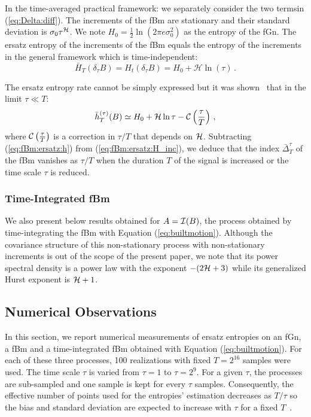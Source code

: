 \documentclass[aps,pra,groupedaddress,notitlepage]{revtex4-1}
\begin{document}
In the time-averaged practical framework: we separately consider the two terms\linebreak in (\ref{eq:Delta:diff}). The increments of the fBm are stationary and their standard deviation is $\sigma_0\tau^{\cal H}$. We note $H_0 = \frac{1}{2}\ln \left( 2\pi e \sigma_0^2\right)$ as the entropy of the fGn. The ersatz entropy of the increments of the fBm equals the entropy of the increments in the general framework which is time-independent:
\begin{equation}
\bar{H}_{T}(\delta_\tau B) = H_{t}(\delta_\tau B) = H_0 + \mathcal{H}\ln(\tau) \,. \label{eq:fBm:ersatz:H_inc}
\end{equation}

The ersatz entropy rate cannot be simply expressed but it was shown~\cite{GraneroBelinchon2019} that in the limit $\tau \ll T$:
\begin{equation}
\bar{h}_{T}^{(\tau)}(B) \simeq H_0 + \mathcal{H} \ln \tau - {\cal C}\left( \frac{\tau}{T}\right) \,, \label{eq:fBm:ersatz:h}
\end{equation}
%
where ${\cal C}\left( \frac{\tau}{T}\right)$ is a correction in $\tau/T$ that depends on ${\cal H}$. Subtracting (\ref{eq:fBm:ersatz:h}) from (\ref{eq:fBm:ersatz:H_inc}), we deduce that the index $\bar{\Delta}_T^{\tau}$ of the fBm vanishes as $\tau/T$ when the duration $T$ of the signal is increased or the time scale $\tau$ is reduced.


\subsubsection{Time-Integrated fBm} We also present below results obtained for $A={\cal I}(B)$, the process obtained by time-integrating the fBm with Equation (\ref{eq:builtmotion}).
Although the covariance structure of this non-stationary process with non-stationary increments is out of the scope of the present paper, we note that its power spectral density is a power law with the exponent $-(2{\cal H}+3)$ while its generalized Hurst exponent is ${\cal H}+1$.

\subsection{Numerical Observations}

In this section, we report numerical measurements of ersatz entropies on an fGn, a fBm and a time-integrated fBm obtained with Equation (\ref{eq:builtmotion}). For each of these three processes, 100 realizations with fixed $T=2^{16}$ samples were used. The time scale $\tau$ is varied from $\tau=1$ to $\tau=2^9$. For a given $\tau$, the processes are sub-sampled and one sample is kept for every $\tau$ samples. Consequently, the effective number of points used for the entropies' estimation decreases as $T/\tau$ so the bias and standard deviation are expected to increase with $\tau$ for a fixed $T$~\cite{GraneroBelinchon2019a,GraneroBelinchon2019}.
\end{document}
